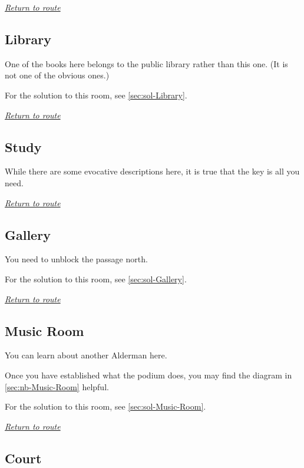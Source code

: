 \documentclass[a5paper]{extarticle}
\begin{document}
\hyperref[sec:route-5]{\emph{Return to route}}

\newpage
\subsection{Library}\label{sec:req-Library}

One of the books here belongs to the public library rather than this one.
(It is not one of the obvious ones.)

For the solution to this room, see \cref{sec:sol-Library}.

\hyperref[sec:route-5]{\emph{Return to route}}

\newpage
\subsection{Study}\label{sec:req-Study}

While there are some evocative descriptions here,
it is true that the key is all you need.

\hyperref[sec:route-5]{\emph{Return to route}}

\newpage
\subsection{Gallery}\label{sec:req-Gallery}

You need to unblock the passage north.

For the solution to this room, see \cref{sec:sol-Gallery}.

\hyperref[sec:route-6]{\emph{Return to route}}

\newpage
\subsection{Music Room}\label{sec:req-Music-Room}

You can learn about another Alderman here.

Once you have established what the podium does, you may find the
diagram in \cref{sec:nb-Music-Room} helpful.

For the solution to this room, see \cref{sec:sol-Music-Room}.

\hyperref[sec:route-6]{\emph{Return to route}}

\newpage
\subsection{Court}\label{sec:req-Court-0}
\end{document}
